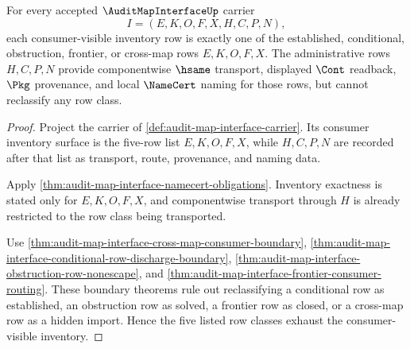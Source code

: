 \begin{theorem}
\label{thm:audit-map-interface-row-class-exhaustion}
For every accepted $\AuditMapInterfaceUp$ carrier
$$
I=(E,K,O,F,X,H,C,P,N),
$$
each consumer-visible inventory row is exactly one of the established, conditional, obstruction, frontier, or cross-map rows $E,K,O,F,X$. The administrative rows $H,C,P,N$ provide componentwise $\hsame$ transport, displayed $\Cont$ readback, $\Pkg$ provenance, and local $\NameCert$ naming for those rows, but cannot reclassify any row class.
\end{theorem}
\begin{proof}
Project the carrier of \autoref{def:audit-map-interface-carrier}. Its consumer inventory surface is the five-row list $E,K,O,F,X$, while $H,C,P,N$ are recorded after that list as transport, route, provenance, and naming data.

Apply \autoref{thm:audit-map-interface-namecert-obligations}. Inventory exactness is stated only for $E,K,O,F,X$, and componentwise transport through $H$ is already restricted to the row class being transported.

Use \autoref{thm:audit-map-interface-cross-map-consumer-boundary}, \autoref{thm:audit-map-interface-conditional-row-discharge-boundary}, \autoref{thm:audit-map-interface-obstruction-row-nonescape}, and \autoref{thm:audit-map-interface-frontier-consumer-routing}. These boundary theorems rule out reclassifying a conditional row as established, an obstruction row as solved, a frontier row as closed, or a cross-map row as a hidden import. Hence the five listed row classes exhaust the consumer-visible inventory.
\end{proof}

